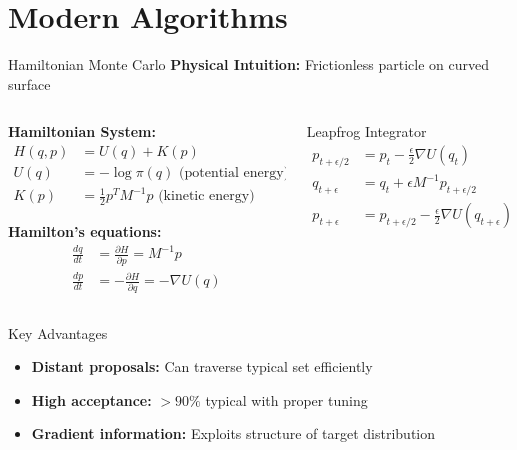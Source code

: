 \documentclass[aspectratio=169,11pt]{beamer}
\begin{document}
\section{Modern Algorithms}

\begin{frame}{Hamiltonian Monte Carlo}
\textbf{Physical Intuition:} Frictionless particle on curved surface

\vspace{0.3cm}
\begin{columns}
\begin{column}{0.6\textwidth}
\textbf{Hamiltonian System:}
\begin{align}
H(q, p) &= U(q) + K(p) \\
U(q) &= -\log \pi(q) \text{ (potential energy)} \\
K(p) &= \frac{1}{2} p^T M^{-1} p \text{ (kinetic energy)}
\end{align}

\textbf{Hamilton's equations:}
\begin{align}
\frac{dq}{dt} &= \frac{\partial H}{\partial p} = M^{-1} p \\
\frac{dp}{dt} &= -\frac{\partial H}{\partial q} = -\nabla U(q)
\end{align}
\end{column}
\begin{column}{0.4\textwidth}
\begin{block}{Leapfrog Integrator}
\begin{align}
p_{t+\epsilon/2} &= p_t - \frac{\epsilon}{2} \nabla U(q_t) \\
q_{t+\epsilon} &= q_t + \epsilon M^{-1} p_{t+\epsilon/2} \\
p_{t+\epsilon} &= p_{t+\epsilon/2} - \frac{\epsilon}{2} \nabla U(q_{t+\epsilon})
\end{align}
\end{block}
\end{column}
\end{columns}

\vspace{0.3cm}
\begin{alertblock}{Key Advantages}
\begin{itemize}
\item \textbf{Distant proposals:} Can traverse typical set efficiently
\item \textbf{High acceptance:} $>90\%$ typical with proper tuning
\item \textbf{Gradient information:} Exploits structure of target distribution
\end{itemize}
\end{alertblock}
\end{frame}
\end{document}
